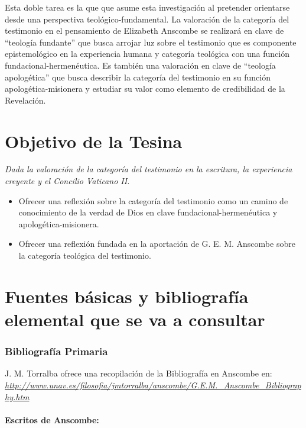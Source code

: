 \documentclass[12pt]{article}
\begin{document}
{Esta doble tarea es la que que asume esta investigación al pretender orientarse desde una perspectiva teológico-fundamental. La valoración de la categoría del testimonio en el pensamiento de Elizabeth Anscombe se realizará en clave de ``teología fundante'' que busca arrojar luz sobre el testimonio que es componente epistemológico en la experiencia humana y categoría teológica con una función fundacional-hermenéutica. Es también una valoración en clave de ``teología apologética'' que busca describir la categoría del testimonio en su función apologética-misionera y estudiar su valor como elemento de credibilidad de la Revelación.


\printbibliography[title={Referencias usadas en la presentación:}]

\part*{Objetivo de la Tesina}

\emph{Dada la valoración de la categoría del testimonio en la escritura, la experiencia creyente y el Concilio Vaticano II.}
\begin{itemize}
  \item Ofrecer una reflexión sobre la categoría del testimonio como un camino de conocimiento de la verdad de Dios en clave fundacional-hermenéutica y apologética-misionera.
  \item Ofrecer una reflexión fundada en la aportación de G. E. M. Anscombe sobre la categoría teológica del testimonio.
\end{itemize}

\part*{Fuentes básicas y bibliografía elemental que se va a consultar}

%

\section{Bibliografía Primaria}
\noindent J. M. Torralba ofrece una recopilación de la Bibliografía en Anscombe en:\\
\emph{\href{http://www.unav.es/filosofia/jmtorralba/anscombe/G.E.M.\_Anscombe\_Bibliography.htm}{http://www.unav.es/filosofia/jmtorralba/anscombe/G.E.M.\_Anscombe\_Bibliography.htm}}

\subsection {Escritos de Anscombe:}

}
\end{document}
